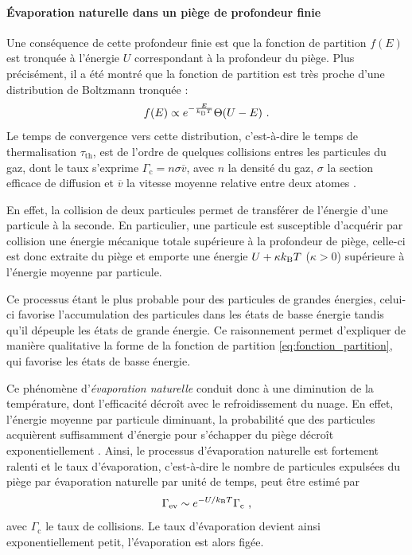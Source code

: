 \paragraph*{Évaporation naturelle dans un piège de profondeur finie}
Une conséquence de cette profondeur finie est que la fonction de partition $f(E)$ est tronquée à l'énergie $U$ correspondant à la profondeur du piège. Plus précisément, il a été montré que la fonction de partition est très proche d'une distribution de Boltzmann tronquée \citep{luiten1996kinetic}:
\begin{equation}
f(E)\propto e^{-\frac{E}{k_{\mathrm{B}} T}} \Theta(U-E) \text{ .}
\label{eq:fonction_partition}
\end{equation}
Le temps de convergence vers cette distribution, c'est-à-dire le temps de thermalisation $\tau_{\mathrm{th}}$, est de l'ordre de quelques collisions entres les particules du gaz, dont le taux s'exprime $\Gamma_{\mathrm{c}}=n \sigma \overline{v}$, avec $n$ la densité du gaz, $\sigma$ la section efficace de diffusion et $\overline{v}$ la vitesse moyenne relative entre deux atomes \citep{walraven2010elements}.

En effet, la collision de deux particules permet de transférer de l'énergie d'une particule à la seconde. En particulier, une particule est susceptible d'acquérir par collision une énergie mécanique totale supérieure à la profondeur de piège, celle-ci est donc extraite du piège et emporte une énergie $U+\kappa k_{\mathrm{B}} T$ ($\kappa>0$) supérieure à l'énergie moyenne par particule. %

Ce processus étant le plus probable pour des particules de grandes énergies, celui-ci favorise l'accumulation des particules dans les états de basse énergie tandis qu'il dépeuple les états de grande énergie. Ce raisonnement permet d'expliquer de manière qualitative la forme de la fonction de partition \ref{eq:fonction_partition}, qui favorise les états de basse énergie.

Ce phénomène d'\emph{évaporation naturelle} conduit donc à une diminution de la température, dont l'efficacité décroît avec le refroidissement du nuage. En effet, l'énergie moyenne par particule diminuant, la probabilité que des particules acquièrent suffisamment d'énergie pour s'échapper du piège décroît exponentiellement \citep{walraven2010elements}. Ainsi, le processus d'évaporation naturelle est fortement ralenti et le taux d'évaporation, c'est-à-dire le nombre de particules expulsées du piège par évaporation naturelle par unité de temps, peut être estimé par 
\begin{equation}
\Gamma_{\mathrm{ev}}\sim e^{-U/k_{\mathrm{B}} T} \Gamma_{\mathrm{c}} \text{ ,}
\label{eq:taux_evap}
\end{equation}
avec $\Gamma_{\mathrm{c}}$ le taux de collisions. Le taux d'évaporation devient ainsi exponentiellement petit, l'évaporation est alors figée. 	

